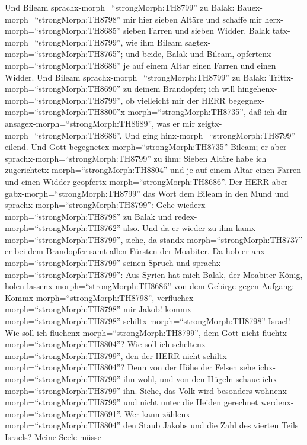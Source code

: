  Und Bileam sprachx-morph=``strongMorph:TH8799'' zu Balak:
Bauex-morph=``strongMorph:TH8798'' mir hier sieben Altäre und schaffe
mir herx-morph=``strongMorph:TH8685'' sieben Farren und sieben Widder.
 Balak tatx-morph=``strongMorph:TH8799'', wie ihm Bileam
sagtex-morph=``strongMorph:TH8765''; und beide, Balak und Bileam,
opfertenx-morph=``strongMorph:TH8686'' je auf einem Altar einen Farren
und einen Widder.  Und Bileam
sprachx-morph=``strongMorph:TH8799'' zu Balak:
Trittx-morph=``strongMorph:TH8690'' zu deinem Brandopfer; ich will
hingehenx-morph=``strongMorph:TH8799'', ob vielleicht mir der HERR
begegnex-morph=``strongMorph:TH8800''x-morph=``strongMorph:TH8735'', daß
ich dir ansagex-morph=``strongMorph:TH8689'', was er mir
zeigtx-morph=``strongMorph:TH8686''. Und ging
hinx-morph=``strongMorph:TH8799'' eilend.  Und Gott
begegnetex-morph=``strongMorph:TH8735'' Bileam; er aber
sprachx-morph=``strongMorph:TH8799'' zu ihm: Sieben Altäre habe ich
zugerichtetx-morph=``strongMorph:TH8804'' und je auf einem Altar einen
Farren und einen Widder geopfertx-morph=``strongMorph:TH8686''.
 Der HERR aber gabx-morph=``strongMorph:TH8799'' das Wort
dem Bileam in den Mund und sprachx-morph=``strongMorph:TH8799'': Gehe
wiederx-morph=``strongMorph:TH8798'' zu Balak und
redex-morph=``strongMorph:TH8762'' also.  Und da er wieder
zu ihm kamx-morph=``strongMorph:TH8799'', siehe, da
standx-morph=``strongMorph:TH8737'' er bei dem Brandopfer samt allen
Fürsten der Moabiter.  Da hob er
anx-morph=``strongMorph:TH8799'' seinen Spruch und
sprachx-morph=``strongMorph:TH8799'': Aus Syrien hat mich Balak, der
Moabiter König, holen lassenx-morph=``strongMorph:TH8686'' von dem
Gebirge gegen Aufgang: Kommx-morph=``strongMorph:TH8798'',
verfluchex-morph=``strongMorph:TH8798'' mir Jakob!
kommx-morph=``strongMorph:TH8798'' schiltx-morph=``strongMorph:TH8798''
Israel!  Wie soll ich fluchenx-morph=``strongMorph:TH8799'',
dem Gott nicht fluchtx-morph=``strongMorph:TH8804''? Wie soll ich
scheltenx-morph=``strongMorph:TH8799'', den der HERR nicht
schiltx-morph=``strongMorph:TH8804''?  Denn von der Höhe der
Felsen sehe ichx-morph=``strongMorph:TH8799'' ihn wohl, und von den
Hügeln schaue ichx-morph=``strongMorph:TH8799'' ihn. Siehe, das Volk
wird besonders wohnenx-morph=``strongMorph:TH8799'' und nicht unter die
Heiden gerechnet werdenx-morph=``strongMorph:TH8691''.  Wer
kann zählenx-morph=``strongMorph:TH8804'' den Staub Jakobs und die Zahl
des vierten Teils Israels? Meine Seele müsse
